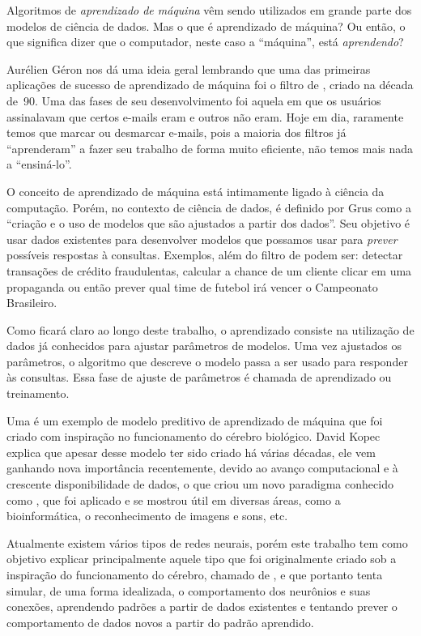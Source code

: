 Algoritmos de \emph{aprendizado de máquina} vêm sendo utilizados em grande parte dos modelos de ciência de dados. Mas o que é aprendizado de máquina? Ou então, o que significa dizer que o computador, neste caso a ``máquina'', está \emph{aprendendo}?

Aurélien Géron \citep{hands} nos dá uma ideia geral lembrando que uma das primeiras aplicações de sucesso de aprendizado de máquina foi o filtro de , criado na década de~90. Uma das fases de seu desenvolvimento foi aquela em que os usuários assinalavam que certos e-mails eram  e outros não eram. Hoje em dia, raramente temos que marcar ou desmarcar e-mails, pois a maioria dos filtros já ``aprenderam'' a fazer seu trabalho de forma muito eficiente, não temos mais nada a ``ensiná-lo''.

O conceito de aprendizado de máquina está intimamente ligado à ciência da computação. Porém, no contexto de ciência de dados, é definido por Grus \citep{data} como a ``criação e o uso de modelos que são ajustados a partir dos dados''. Seu objetivo é usar dados existentes para desenvolver modelos que possamos usar para \emph{prever} possíveis respostas à consultas. Exemplos, além do filtro de  podem ser: detectar transações de crédito fraudulentas, calcular a chance de um cliente clicar em uma propaganda ou então prever qual time de futebol irá vencer o Campeonato Brasileiro.

Como ficará claro ao longo deste trabalho, o aprendizado consiste na utilização de dados já conhecidos para ajustar parâmetros de modelos. Uma vez ajustados os parâmetros, o algoritmo que descreve o modelo passa a ser usado para responder às consultas. Essa fase de ajuste de parâmetros é chamada de aprendizado ou treinamento. 

Uma  é um exemplo de modelo preditivo de aprendizado de máquina que foi criado com inspiração no funcionamento do cérebro biológico. David Kopec \citep{classic} explica que apesar desse modelo ter sido criado há várias décadas, ele vem ganhando nova importância recentemente, devido ao avanço computacional e à crescente disponibilidade de dados, o que criou um novo paradigma conhecido como , que foi aplicado e se mostrou útil em diversas áreas, como a bioinformática, o reconhecimento de imagens e sons, etc.

Atualmente existem vários tipos de redes neurais, porém este trabalho tem como objetivo explicar principalmente aquele tipo que foi originalmente criado sob a inspiração do funcionamento do cérebro, chamado de , e que portanto tenta simular, de uma forma idealizada, o comportamento dos neurônios e suas conexões, aprendendo padrões a partir de dados existentes e tentando prever o comportamento de dados novos a partir do padrão aprendido.

